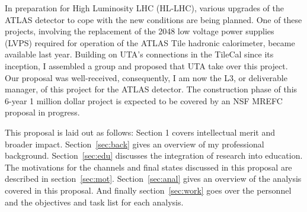 \documentclass[11pt]{article}
\begin{document}
In preparation for High Luminosity LHC (HL-LHC), various upgrades of the ATLAS detector to cope with the new conditions are being planned. One of these projects, involving the replacement of the 2048 low voltage power supplies (LVPS) 
required for operation of the ATLAS Tile hadronic calorimeter, became available last year.  
Building on UTA's connections in the TileCal since its inception, I assembled a group and proposed that UTA take over this project. 
Our proposal was well-received, consequently, I am now the L3, or deliverable manager, of this project for the ATLAS detector. The construction phase of this 6-year 
1 million dollar project is expected to be covered by an NSF MREFC proposal in progress. %



This proposal is laid out as follows:
Section 1 covers intellectual merit and broader impact.
Section~\ref{sec:back} gives an overview of my professional background.  
Section~\ref{sec:edu} discusses the integration of research into education.
The motivations for the channels and final states discussed in this proposal are described in section~\ref{sec:mot}.  
Section~\ref{sec:anal} gives an overview of the analysis covered in this proposal.
And finally section~\ref{sec:work} goes over the personnel and the objectives and task list for each analysis.
\end{document}
